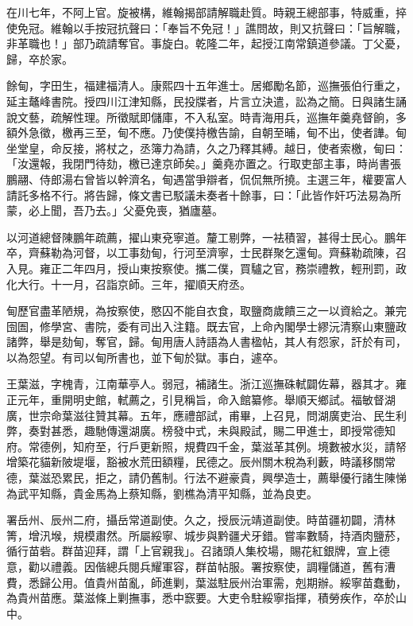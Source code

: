 \begin{pinyinscope}
在川七年，不阿上官。旋被構，維翰揭部請解職赴質。時親王總部事，特威重，捽使免冠。維翰以手按冠抗聲曰：「奉旨不免冠！」譙問故，則又抗聲曰：「旨解職，非革職也！」部乃疏請奪官。事旋白。乾隆二年，起授江南常鎮道參議。丁父憂，歸，卒於家。

餘甸，字田生，福建福清人。康熙四十五年進士。居鄉勵名節，巡撫張伯行重之，延主鼇峰書院。授四川江津知縣，民投牒者，片言立決遣，訟為之簡。日與諸生誦說文藝，疏解性理。所徵賦即儲庫，不入私室。時青海用兵，巡撫年羹堯督餉，多額外急徵，檄再三至，甸不應。乃使僕持檄告諭，自朝至晡，甸不出，使者譁。甸坐堂皇，命反接，將杖之，丞簿力為請，久之乃釋其縛。越日，使者索檄，甸曰：「汝還報，我閉門待劾，檄已達京師矣。」羹堯亦置之。行取吏部主事，時尚書張鵬翮、侍郎湯右曾皆以幹濟名，甸遇當爭辯者，侃侃無所撓。主選三年，權要富人請託多格不行。將告歸，條文書已駁議未奏者十餘事，曰：「此皆作奸巧法易為所蒙，必上聞，吾乃去。」父憂免喪，猶廬墓。

以河道總督陳鵬年疏薦，擢山東兗寧道。釐工剔弊，一袪積習，甚得士民心。鵬年卒，齊蘇勒為河督，以工事劾甸，行河至濟寧，士民群聚乞還甸。齊蘇勒疏陳，召入見。雍正二年四月，授山東按察使。攜二僕，買驢之官，務崇禮教，輕刑罰，政化大行。十一月，召詣京師。三年，擢順天府丞。

甸歷官盡革陋規，為按察使，愍囚不能自衣食，取鹽商歲饋三之一以資給之。兼完囹圄，修學宮、書院，委有司出入注籍。既去官，上命內閣學士繆沅清察山東鹽政諸弊，舉是劾甸，奪官，歸。甸用唐人詩語為人書楹帖，其人有怨家，訐於有司，以為怨望。有司以甸所書也，並下甸於獄。事白，遽卒。

王葉滋，字槐青，江南華亭人。弱冠，補諸生。浙江巡撫硃軾闢佐幕，器其才。雍正元年，重開明史館，軾薦之，引見稱旨，命入館纂修。舉順天鄉試。福敏督湖廣，世宗命葉滋往贊其幕。五年，應禮部試，甫畢，上召見，問湖廣吏治、民生利弊，奏對甚悉，趣馳傳還湖廣。榜發中式，未與殿試，賜二甲進士，即授常德知府。常德例，知府至，行戶更新照，規費四千金，葉滋革其例。境數被水災，請帑增築花貓新陂堤堰，豁被水荒田額糧，民德之。辰州關木稅為利藪，時議移關常德，葉滋恐累民，拒之，請仍舊制。行法不避豪貴，興學造士，薦舉優行諸生陳悌為武平知縣，貴金馬為上蔡知縣，劉樵為清平知縣，並為良吏。

署岳州、辰州二府，攝岳常道副使。久之，授辰沅靖道副使。時苗疆初闢，清林箐，增汛堠，規模肅然。所屬綏寧、城步與黔疆犬牙錯。嘗率數騎，持酒肉鹽菸，循行苗砦。群苗迎拜，謂「上官親我」。召諸頭人集校場，賜花紅銀牌，宣上德意，勸以禮義。因偕總兵閱兵耀軍容，群苗帖服。署按察使，調糧儲道，舊有漕費，悉歸公用。值貴州苗亂，師進剿，葉滋駐辰州治軍需，剋期辦。綏寧苗蠢動，為貴州苗應。葉滋條上剿撫事，悉中窾要。大吏令駐綏寧指揮，積勞疾作，卒於山中。


\end{pinyinscope}
